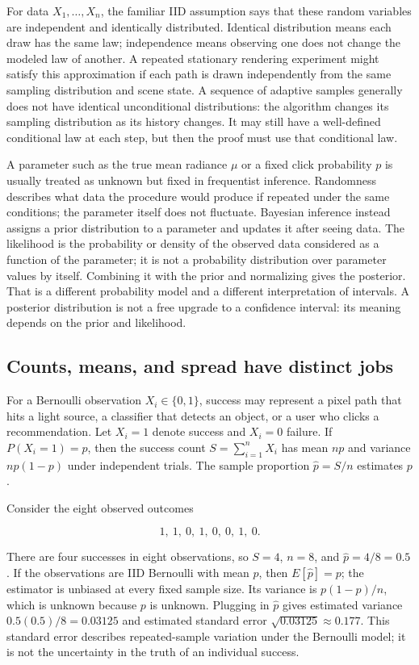 For data \(X_1,\ldots,X_n\), the familiar IID assumption says that these random variables are independent and identically distributed. Identical distribution means each draw has the same law; independence means observing one does not change the modeled law of another. A repeated stationary rendering experiment might satisfy this approximation if each path is drawn independently from the same sampling distribution and scene state. A sequence of adaptive samples generally does not have identical unconditional distributions: the algorithm changes its sampling distribution as its history changes. It may still have a well-defined conditional law at each step, but then the proof must use that conditional law.

A parameter such as the true mean radiance \(\mu\) or a fixed click probability \(p\) is usually treated as unknown but fixed in frequentist inference. Randomness describes what data the procedure would produce if repeated under the same conditions; the parameter itself does not fluctuate. Bayesian inference instead assigns a prior distribution to a parameter and updates it after seeing data. The likelihood is the probability or density of the observed data considered as a function of the parameter; it is not a probability distribution over parameter values by itself. Combining it with the prior and normalizing gives the posterior. That is a different probability model and a different interpretation of intervals. A posterior distribution is not a free upgrade to a confidence interval: its meaning depends on the prior and likelihood.

\subsection{Counts, means, and spread have distinct jobs}\label{03-visual-computing-i-ch012-counts-means-and-spread-have-distinct-jobs}

For a Bernoulli observation \(X_i\in\{0,1\}\), success may represent a pixel path that hits a light source, a classifier that detects an object, or a user who clicks a recommendation. Let \(X_i=1\) denote success and \(X_i=0\) failure. If \(P(X_i=1)=p\), then the success count \(S=\sum_{i=1}^n X_i\) has mean \(np\) and variance \(np(1-p)\) under independent trials. The sample proportion \(\hat p=S/n\) estimates \(p\).

Consider the eight observed outcomes

\[
1,\ 1,\ 0,\ 1,\ 0,\ 0,\ 1,\ 0.
\]

There are four successes in eight observations, so \(S=4\), \(n=8\), and \(\hat p=4/8=0.5\). If the observations are IID Bernoulli with mean \(p\), then \(E[\hat p]=p\); the estimator is unbiased at every fixed sample size. Its variance is \(p(1-p)/n\), which is unknown because \(p\) is unknown. Plugging in \(\hat p\) gives estimated variance \(0.5(0.5)/8=0.03125\) and estimated standard error \(\sqrt{0.03125}\approx0.177\). This standard error describes repeated-sample variation under the Bernoulli model; it is not the uncertainty in the truth of an individual success.

